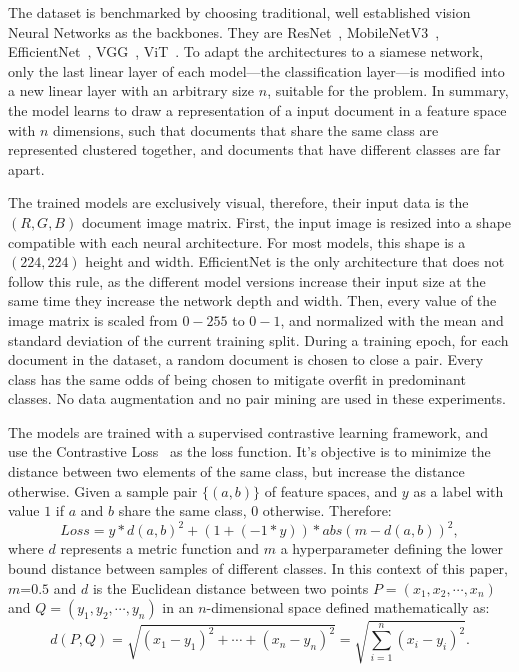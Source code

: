 The dataset is benchmarked by choosing traditional, well established vision Neural Networks as the backbones. They are ResNet~\cite{he_deep_2016}, MobileNetV3~\cite{howard_searching_2019}, EfficientNet~\cite{tan_efficientnet_2019}, VGG~\cite{simonyan_very_2015}, \gls{ViT}~\cite{dosovitskiy_image_2021}. To adapt the architectures to a siamese network, only the last linear layer of each model---the classification layer---is modified into a new linear layer with an arbitrary size $n$, suitable for the problem. In summary, the model learns to draw a representation of a input document in a feature space with $n$ dimensions, such that documents that share the same class are represented clustered together, and documents that have different classes are far apart. 

The trained models are exclusively visual, therefore, their input data is the $(R, G, B)$ document image matrix. First, the input image is resized into a shape compatible with each neural architecture. For most models, this shape is a $(224, 224)$ height and width. EfficientNet is the only architecture that does not follow this rule, as the different model versions increase their input size at the same time they increase the network depth and width. Then, every value of the image matrix is scaled from $0-255$ to $0-1$, and normalized with the mean and standard deviation of the current training split. During a training epoch, for each document in the dataset, a random document is chosen to close a pair. Every class has the same odds of being chosen to mitigate overfit in predominant classes. No data augmentation and no pair mining are used in these experiments.

The models are trained with a supervised contrastive learning framework, and use the Contrastive Loss~\cite{chopra_learning_2005} as the loss function. It's objective is to minimize the distance between two elements of the same class, but increase the distance otherwise. Given a sample pair $\{(a, b)\}$ of feature spaces, and $y$ as a label with value $1$ if $a$ and $b$ share the same class, $0$ otherwise. Therefore: 
\begin{equation}
        Loss = y * d(a, b)^2 + (1 + (-1 * y)) * abs(m - d(a, b))^2,
\end{equation}
where $d$ represents a metric function and $m$ a hyperparameter defining the lower bound distance between samples of different classes. In this context of this paper, $m$=$0.5$ and $d$ is the Euclidean distance between two points $P = (x_1, x_2, \cdots, x_n)$ and $Q = (y_1, y_2, \cdots, y_n)$ in an $n$-dimensional space defined mathematically as:
\begin{equation}
d(P,Q)={\sqrt {(x_{1}-y_{1})^{2}+ \cdots +(x_{n}-y_{n})^{2}}} = \sqrt{ \sum_{i=1}^{n} (x_i - y_i)^2 }.
\end{equation}